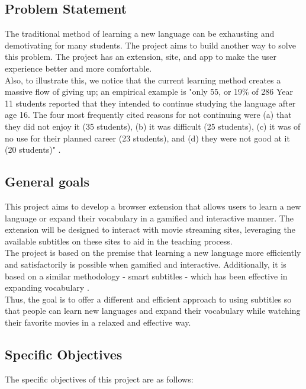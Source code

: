 \documentclass[12pt]{article}
\begin{document}
\subsection{Problem Statement}
The traditional method of learning a new language can be exhausting and demotivating for many students. The project aims to build another way to solve this problem. The project has an extension, site, and app to make the user experience better and more comfortable. \\
Also, to illustrate this, we notice that the current learning method creates a massive flow of giving up; an empirical example is "only 55, or 19\% of 286 Year 11 students reported that they intended to continue studying the language after age 16. The four most frequently cited reasons for not continuing were (a) that they did not enjoy it (35 students), (b) it was difficult (25 students), (c) it was of no use for their planned career (23 students), and (d) they were not good at it (20 students)" \cite{Graham1}. 

\subsection{General goals}

This project aims to develop a browser extension that allows users to learn a new language or expand their vocabulary in a gamified and interactive manner. The extension will be designed to interact with movie streaming sites, leveraging the available subtitles on these sites to aid in the teaching process. \\
The project is based on the premise that learning a new language more efficiently and satisfactorily is possible when gamified and interactive. Additionally, it is based on a similar methodology - smart subtitles - which has been effective in expanding vocabulary \cite{Kovacs14}. \\
Thus, the goal is to offer a different and efficient approach to using subtitles so that people can learn new languages and expand their vocabulary while watching their favorite movies in a relaxed and effective way.
\subsection{Specific Objectives}

The specific objectives of this project are as follows:
\end{document}

